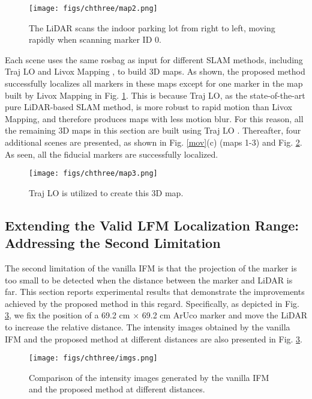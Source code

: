 %
\begin{figure}[H] 
	\centering
\texttt{[image: figs/chthree/map2.png]}
	\caption{The LiDAR scans the indoor parking lot from right to left, moving rapidly when scanning marker ID 0.}
	\label{map2}
\end{figure} 
%
Each scene uses the same rosbag as input for different SLAM methods, including Traj LO \cite{traj} and Livox Mapping \cite{sdk}, to build 3D maps. As shown, the proposed method successfully localizes all markers in these maps except for one marker in the map built by Livox Mapping in Fig. \ref{map2}. This is because Traj LO, as the state-of-the-art pure LiDAR-based SLAM method, is more robust to rapid motion \cite{traj} than Livox Mapping, and therefore produces maps with less motion blur. For this reason, all the remaining 3D maps in this section are built using Traj LO \cite{traj}. Thereafter, four additional scenes are presented, as shown in Fig. \ref{mov}(c) (maps 1-3) and Fig. \ref{map3}. As seen, all the fiducial markers are successfully localized. 
\begin{figure}[H] 
	\centering
\texttt{[image: figs/chthree/map3.png]}
	\caption{Traj LO \cite{traj} is utilized to create this 3D map.}
	\label{map3}
\end{figure}

\subsection{Extending the Valid LFM Localization Range:\\ Addressing the Second Limitation} \label{322}
The second limitation of the vanilla IFM is that the projection of the marker is too small to be detected when the distance between the marker and LiDAR is far. This section reports experimental results that demonstrate the improvements achieved by the proposed method in this regard. Specifically, as depicted in Fig. \ref{imgs}, we fix the position of a 69.2 cm $\times$ 69.2 cm ArUco marker and move the LiDAR to increase the relative distance. The intensity images obtained by the vanilla IFM and the proposed method at different distances are also presented in Fig. \ref{imgs}. 
\begin{figure}[ht] 
	\centering
\texttt{[image: figs/chthree/imgs.png]}
	\caption{Comparison of the intensity images generated by the vanilla IFM and the proposed method at different distances.}
	\label{imgs}
\end{figure}

